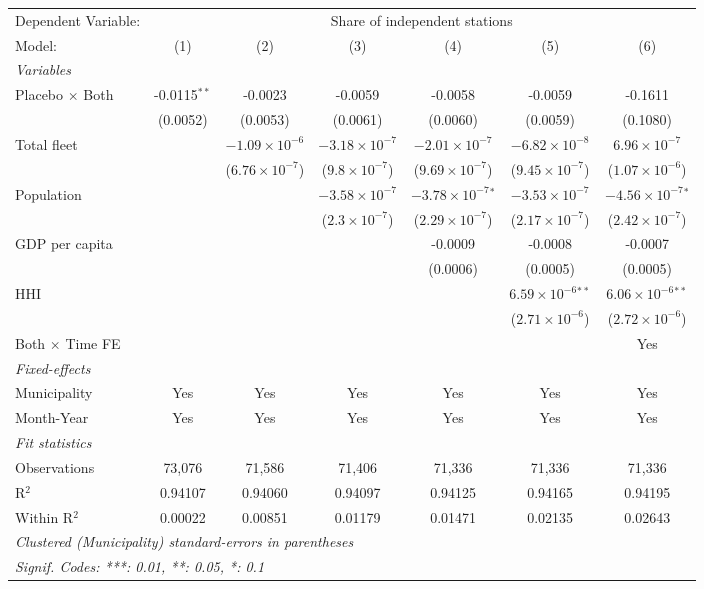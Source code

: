 \documentclass[
]{article}
\begin{document}
\begin{tabular}{lcccccc}
\tabularnewline\midrule\midrule
Dependent Variable:&\multicolumn{6}{c}{Share of independent stations}\\
Model:&(1) & (2) & (3) & (4) & (5) & (6)\\
\midrule \emph{Variables}&   &   &   &   &   &  \\
Placebo $\times $ Both & -0.0115$^{**}$ & -0.0023 & -0.0059 & -0.0058 & -0.0059 & -0.1611\\
  &(0.0052) & (0.0053) & (0.0061) & (0.0060) & (0.0059) & (0.1080)\\
Total fleet &    & $-1.09\times 10^{-6}$ & $-3.18\times 10^{-7}$ & $-2.01\times 10^{-7}$ & $-6.82\times 10^{-8}$ & $6.96\times 10^{-7}$\\
  &   & ($6.76\times 10^{-7}$) & ($9.8\times 10^{-7}$) & ($9.69\times 10^{-7}$) & ($9.45\times 10^{-7}$) & ($1.07\times 10^{-6}$)\\
Population &    &    & $-3.58\times 10^{-7}$ & $-3.78\times 10^{-7}$$^{*}$ & $-3.53\times 10^{-7}$ & $-4.56\times 10^{-7}$$^{*}$\\
  &   &    & ($2.3\times 10^{-7}$) & ($2.29\times 10^{-7}$) & ($2.17\times 10^{-7}$) & ($2.42\times 10^{-7}$)\\
GDP per capita &    &    &    & -0.0009 & -0.0008 & -0.0007\\
  &   &    &    & (0.0006) & (0.0005) & (0.0005)\\
HHI &    &    &    &    & $6.59\times 10^{-6}$$^{**}$ & $6.06\times 10^{-6}$$^{**}$\\
  &   &    &    &    & ($2.71\times 10^{-6}$) & ($2.72\times 10^{-6}$)\\
Both $\times$ Time FE &  &  &  &  &  & Yes\\
\midrule \emph{Fixed-effects}&   &   &   &   &   &  \\
Municipality & Yes & Yes & Yes & Yes & Yes & Yes\\
Month-Year & Yes & Yes & Yes & Yes & Yes & Yes\\
\midrule \emph{Fit statistics}&  & & & & & \\
Observations & 73,076&71,586&71,406&71,336&71,336&71,336\\
R$^2$ & 0.94107&0.94060&0.94097&0.94125&0.94165&0.94195\\
Within R$^2$ & 0.00022&0.00851&0.01179&0.01471&0.02135&0.02643\\
\midrule\midrule\multicolumn{7}{l}{\emph{Clustered (Municipality) standard-errors in parentheses}}\\
\multicolumn{7}{l}{\emph{Signif. Codes: ***: 0.01, **: 0.05, *: 0.1}}\\
\end{tabular}
\end{document}
